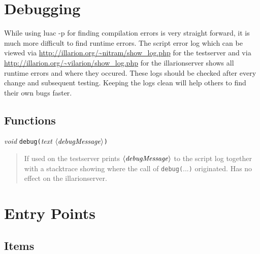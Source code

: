 \documentclass[a4paper,10pt,makeidx]{scrreprt}
\newcommand{\com}[2]{\index{#1}\texttt{#1(}#2\texttt{)}}
\newcommand{\var}[1]{$\left\langle \text{\emph{#1}} \right\rangle$}
\newcommand{\void}{\textsl{void }}
\newcommand{\txt}{\textsl{text }}
\begin{document}
\chapter{Debugging}
While using luac -p for finding compilation errors is very straight forward, it is much more difficult to find runtime errors. The script error log which can be viewed via \url{http://illarion.org/~nitram/show_log.php} for the testserver and via \url{http://illarion.org/~vilarion/show_log.php} for the illarionserver shows all runtime errors and where they occured. These logs should be checked after every change and subsequent testing. Keeping the logs clean will help others to find their own bugs faster.

\section{Functions}
\void \com{debug}{\txt \var{debugMessage}}
\begin{quote}
       If used on the testserver prints \var{debugMessage} to the script log together with a stacktrace showing where the call of \com{debug}{...} originated. Has no effect on the illarionserver.
\end{quote}

\chapter{Entry Points}

\section{Items}
\end{document}
